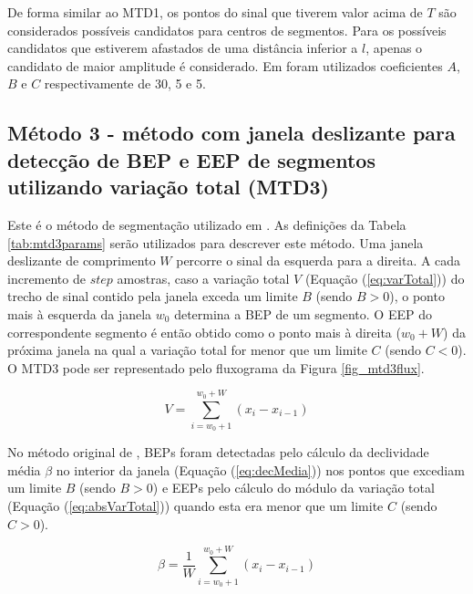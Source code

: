 



De forma similar ao MTD1, os pontos do sinal que tiverem valor acima de $T$ são considerados possíveis candidatos para centros de segmentos. Para os possíveis candidatos que estiverem afastados de uma distância inferior a $l$, apenas o candidato de maior amplitude é considerado. Em  foram utilizados coeficientes $A$, $B$ e $C$ respectivamente de 30, 5 e 5.

			\subsection{Método 3 - método com janela deslizante para detecção de BEP e EEP de segmentos utilizando variação total (MTD3)}
Este é o método de segmentação utilizado em . As definições da Tabela \ref{tab:mtd3params} serão utilizados para descrever este método. Uma janela deslizante de comprimento $W$ percorre o sinal da esquerda para a direita. A cada incremento de $step$ amostras, caso a variação total $V$ (Equação (\ref{eq:varTotal})) do trecho de sinal contido pela janela exceda um limite $B$ (sendo $B > 0$), o ponto mais à esquerda da janela $w_0$ determina a BEP de um segmento. O EEP do correspondente segmento é então obtido como o ponto mais à direita ($w_0 + W$) da próxima janela na qual a variação total for menor que um limite $C$ (sendo $C < 0$). O MTD3 pode ser representado pelo fluxograma da Figura \ref{fig_mtd3flux}.



\begin{equation}
	\label{eq:varTotal}
	V = \sum\limits_{i=w_0+1}^{w_0+W} (x_i - x_{i-1})
\end{equation}

No método original de , BEPs foram detectadas pelo cálculo da declividade média $\beta$ no interior da janela (Equação (\ref{eq:decMedia})) nos pontos que excediam um limite $B$ (sendo $B > 0$) e EEPs pelo cálculo do módulo da variação total (Equação (\ref{eq:absVarTotal})) quando esta era menor que um limite $C$ (sendo $C > 0$).

\begin{equation}
	\label{eq:decMedia}
	\beta = \frac{1}{W}\sum\limits_{i=w_0+1}^{w_0+W} (x_i - x_{i-1})
\end{equation}

